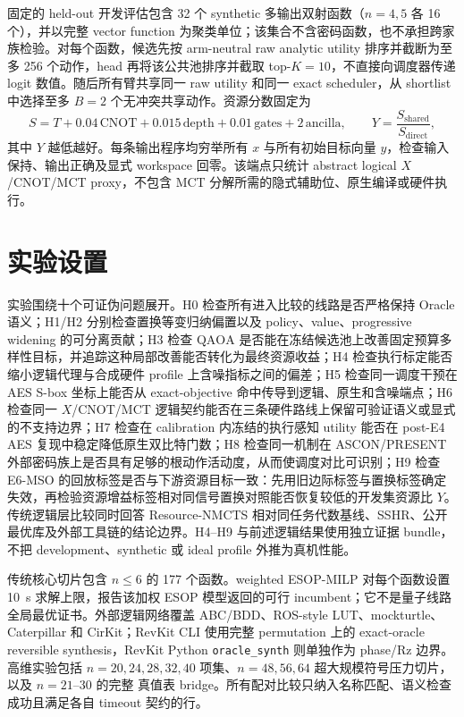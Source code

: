 \documentclass[UTF8,fontset=fandol,11pt]{ctexart}
\newcommand{\method}{Resource-NMCTS}
\newcommand{\qaoa}{\ensuremath{\mathrm{QAOA}}}
\newcommand{\ttable}{真值表}
\begin{document}
固定的 held-out 开发评估包含 32 个 synthetic 多输出双射函数（$n=4,5$ 各 16 个），并以完整 vector function 为聚类单位；该集合不含密码函数，也不承担跨家族检验。对每个函数，候选先按 arm-neutral raw analytic utility 排序并截断为至多 256 个动作，head 再将该公共池排序并截取 top-$K=10$，不直接向调度器传递 logit 数值。随后所有臂共享同一 raw utility 和同一 exact scheduler，从 shortlist 中选择至多 $B=2$ 个无冲突共享动作。资源分数固定为
\begin{equation}
S=T+0.04\,\mathrm{CNOT}+0.015\,\mathrm{depth}+0.01\,\mathrm{gates}+2\,\mathrm{ancilla},
\qquad
Y=\frac{S_{\mathrm{shared}}}{S_{\mathrm{direct}}},
\label{eq:e6-development-endpoint}
\end{equation}
其中 $Y$ 越低越好。每条输出程序均穷举所有 $x$ 与所有初始目标向量 $y$，检查输入保持、输出正确及显式 workspace 回零。该端点只统计 abstract logical $X$/CNOT/MCT proxy，不包含 MCT 分解所需的隐式辅助位、原生编译或硬件执行。

\section{实验设置}

实验围绕十个可证伪问题展开。H0 检查所有进入比较的线路是否严格保持 Oracle 语义；H1/H2 分别检查置换等变归纳偏置以及 policy、value、progressive widening 的可分离贡献；H3 检查 \qaoa{} 是否能在冻结候选池上改善固定预算多样性目标，并追踪这种局部改善能否转化为最终资源收益；H4 检查执行标定能否缩小逻辑代理与合成硬件 profile 上含噪指标之间的偏差；H5 检查同一调度干预在 AES S-box 坐标上能否从 exact-objective 命中传导到逻辑、原生和含噪端点；H6 检查同一 $X$/CNOT/MCT 逻辑契约能否在三条硬件路线上保留可验证语义或显式的不支持边界；H7 检查在 calibration 内冻结的执行感知 utility 能否在 post-E4 AES 复现中稳定降低原生双比特门数；H8 检查同一机制在 ASCON/PRESENT 外部密码族上是否具有足够的根动作活动度，从而使调度对比可识别；H9 检查 E6-MSO 的回放标签是否与下游资源目标一致：先用旧边际标签与置换标签确定失效，再检验资源增益标签相对同信号置换对照能否恢复较低的开发集资源比 $Y$。传统逻辑层比较同时回答 \method{} 相对同任务代数基线、SSHR、公开最优库及外部工具链的结论边界。H4--H9 与前述逻辑结果使用独立证据 bundle，不把 development、synthetic 或 ideal profile 外推为真机性能。

传统核心切片包含 $n\leq6$ 的 177 个函数。weighted ESOP-MILP 对每个函数设置 10~s 求解上限，报告该加权 ESOP 模型返回的可行 incumbent；它不是量子线路全局最优证书。外部逻辑网络覆盖 ABC/BDD、ROS-style LUT、mockturtle、Caterpillar 和 CirKit；RevKit CLI 使用完整 permutation 上的 exact-oracle reversible synthesis，RevKit Python \texttt{oracle\_synth} 则单独作为 phase/Rz 边界。高维实验包括 $n=20,24,28,32,40$ 项集、$n=48,56,64$ 超大规模符号压力切片，以及 $n=21$--$30$ 的完整 \ttable{} bridge。所有配对比较只纳入名称匹配、语义检查成功且满足各自 timeout 契约的行。
\end{document}
